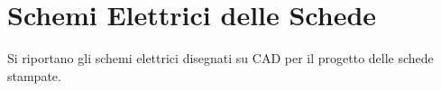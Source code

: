\appendix
\chapter{Schemi Elettrici delle Schede}\label{circuit_diagrams}

Si riportano gli schemi elettrici disegnati su CAD per il progetto delle schede stampate.

